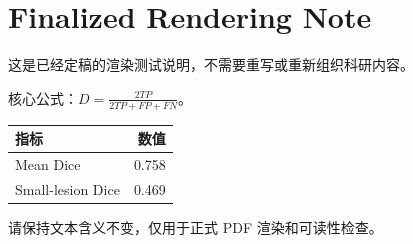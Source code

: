 \documentclass[
  11pt,
  a4paper,
]{article}
\author{}
\date{}
\begin{document}
\hypertarget{finalized-rendering-note}{%
\section{Finalized Rendering Note}\label{finalized-rendering-note}}

这是已经定稿的渲染测试说明，不需要重写或重新组织科研内容。

核心公式：\(D = \frac{2TP}{2TP + FP + FN}\)。

\begin{longtable}[]{@{}lr@{}}
\toprule
指标 & 数值 \\
\midrule
\endhead
Mean Dice & 0.758 \\
Small-lesion Dice & 0.469 \\
\bottomrule
\end{longtable}

请保持文本含义不变，仅用于正式 PDF 渲染和可读性检查。
\end{document}
